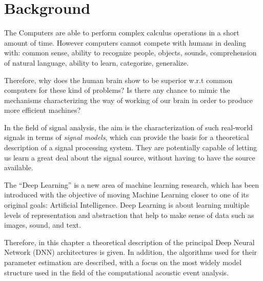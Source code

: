 \chapter{Background}\label{ch:backg}

The Computers are able to perform complex calculus operations in a short amount of time.
However computers cannot compete with humans in dealing with: common sense, ability to recognize people, objects, sounds, comprehension of natural language, ability to learn, categorize, generalize.

Therefore, why does the human brain show to be superior w.r.t common computers for these kind of problems?
Is there any chance to mimic the mechanisms characterizing the way of working of our brain in order to produce more efficient machines?

In the field of signal analysis, the aim is the characterization of such real-world signals in terms of \textit{signal models}, which can provide the basis for a theoretical description of a signal processing system. They are potentially capable of letting us learn a great deal about the signal source, without having to have the source available.

The ``Deep Learning'' is a new area of machine learning
research, which has been introduced with the objective of moving
Machine Learning closer to one of its original goals: Artificial Intelligence. Deep Learning is about learning multiple levels of
representation and abstraction that help to make sense of data
such as images, sound, and text.

Therefore, in this chapter a theoretical description of the principal Deep Neural Network (DNN) architectures is given. In addition, the algorithms used for their parameter estimation are described, with a focus on the most widely model structure used in the field of the computational acoustic event analysis.





